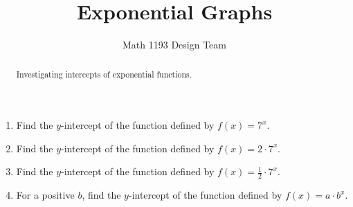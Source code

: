 \documentclass[noauthor]{ximera}
\title{Exponential Graphs}
\author{Math 1193 Design Team}
\begin{document}
\begin{abstract}
    Investigating intercepts of exponential functions.
\end{abstract}
\maketitle

\begin{enumerate}
    \item Find the \(y\)-intercept of the function defined by \(f\left(x\right)=7^x\).
    \item Find the \(y\)-intercept of the function defined by \(f\left(x\right)=2\cdot 7^x\).
    \item Find the \(y\)-intercept of the function defined by \(f\left(x\right)=\frac{1}{2}\cdot 7^x\).
    \item For a positive \(b\), find the \(y\)-intercept of the function defined by \(f\left(x\right)=a\cdot b^x\).
\end{enumerate}
\end{document}
